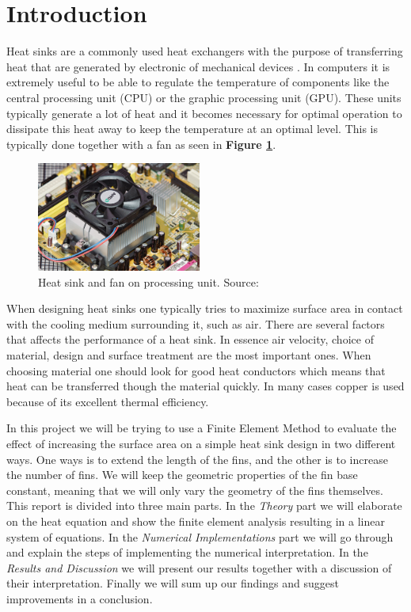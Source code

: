 \section{Introduction}
Heat sinks are a commonly used heat exchangers with the purpose of transferring heat that are generated by electronic of mechanical devices \cite{wiki_hs}. In computers it is extremely useful to be able to regulate the temperature of components like the central processing unit (CPU) or the graphic processing unit	(GPU). These units typically generate a lot of heat and it becomes necessary for optimal operation to dissipate this heat away to keep the temperature at an optimal level. This is typically done together with a fan as seen in \textbf{Figure \ref{fig:heatsink_and_fan}}. 

\begin{figure}
	\begin{center}
		\includegraphics[width=0.48\textwidth]{../figures/heatsink_and_fan.jpg}
	\end{center}
	\caption{Heat sink and fan on processing unit. Source: \cite{wiki_hs}}
    \label{fig:heatsink_and_fan}
\end{figure}

When designing heat sinks one typically tries to maximize surface area in contact with the cooling medium surrounding it, such as air. There are several factors that affects the performance of a heat sink. In essence air velocity, choice of material, design and surface treatment are the most important ones. When choosing material one should look for good heat conductors which means that heat can be transferred though the material quickly. In many cases copper is used because of its excellent thermal efficiency.

In this project we will be trying to use a Finite Element Method to evaluate the effect of increasing the surface area on a simple heat sink design in two different ways. One ways is to extend the length of the fins, and the other is to increase the number of fins. We will keep the geometric properties of the fin base constant, meaning that we will only vary the geometry of the fins themselves. This report is divided into three main parts. In the \textit{Theory} part we will elaborate on the heat equation and show the finite element analysis resulting in a linear system of equations. In the \textit{Numerical Implementations} part we will go through and explain the steps of implementing the numerical interpretation. In the \textit{Results and Discussion} we will present our results together with a discussion of their interpretation. Finally we will sum up our findings and suggest improvements in a conclusion.
